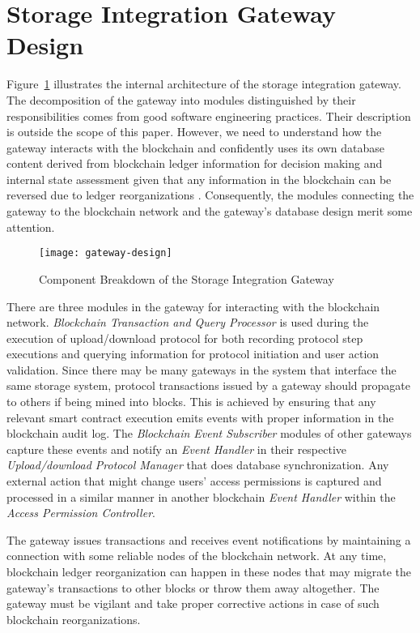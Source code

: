 \section{Storage Integration Gateway Design}
Figure~\ref{fig:gatew} illustrates the internal architecture of the storage integration gateway. The decomposition of the gateway into modules distinguished by their responsibilities comes from good software engineering practices. Their description is outside the scope of this paper. However, we need to understand how the gateway interacts with the blockchain and confidently uses its own database content derived from blockchain ledger information for decision making and internal state assessment given that any information in the blockchain can be reversed due to ledger reorganizations \cite{reorg}. Consequently, the modules connecting the gateway to the blockchain network and the gateway's database design merit some attention.       
\label{s-gate}
\begin{figure}[h]
\centering
\texttt{[image: gateway-design]}                    
\caption{Component Breakdown of the Storage Integration Gateway}\label{fig:gatew}
\end{figure}

There are three modules in the gateway for interacting with the blockchain network. {\it Blockchain Transaction and Query Processor} is used during the execution of upload/download protocol for both recording protocol step executions and querying information for protocol initiation and user action validation. Since there may be many gateways in the system that interface the same storage system, protocol transactions issued by a gateway should propagate to others if being mined into blocks. This is achieved by ensuring that any relevant smart contract execution emits events with proper information in the blockchain audit log. The {\it Blockchain Event Subscriber} modules of other gateways capture these events and notify an {\it Event Handler} in their respective {\it Upload/download Protocol Manager} that does database synchronization. Any external action that might change users' access permissions is captured and processed in a similar manner in another blockchain {\it Event Handler} within the {\it Access Permission Controller}.

The gateway issues transactions and receives event notifications by maintaining a connection with some reliable nodes of the blockchain network. At any time, blockchain ledger reorganization can happen in these nodes that may migrate the gateway's transactions to other blocks or throw them away altogether. The gateway must be vigilant and take proper corrective actions in case of such blockchain  reorganizations.

